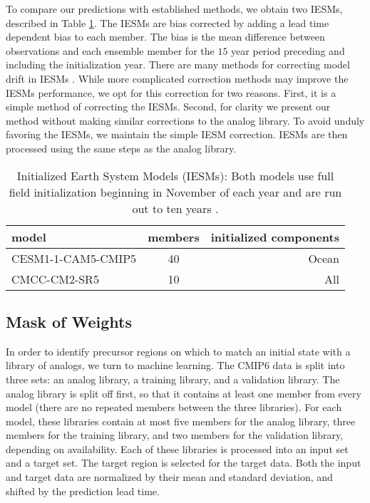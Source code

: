 To compare our predictions with established methods, we obtain two IESMs, described in Table \ref{table:iesms}.
The IESMs are bias corrected by adding a lead time dependent bias to each member.
The bias is the mean difference between observations and each ensemble member for the $15$ year period preceding and including the initialization year.
There are many methods for correcting model drift in IESMs \cite{meehl2022}.
While more complicated correction methods may improve the IESMs performance, we opt for this correction for two reasons.
First, it is a simple method of correcting the IESMs.
Second, for clarity we present our method without making similar corrections to the analog library.
To avoid unduly favoring the IESMs, we maintain the simple IESM correction.
IESMs are then processed using the same steps as the analog library.

\begin{table}
    \caption{
        Initialized Earth System Models (IESMs): Both models use full field initialization beginning in November of each year and are run out to ten years \cite{meehl2021}.
    }\label{table:iesms}
    \centering
    \begin{tabular}{l c r}
        \hline
        model & members & initialized components \\
        \hline
        CESM1-1-CAM5-CMIP5 & 40 & Ocean  \\
        CMCC-CM2-SR5       & 10 & All    \\
        \hline
    \end{tabular}
\end{table}

\subsection{Mask of Weights}\label{sec:mask}

In order to identify precursor regions on which to match an initial state with a library of analogs, we turn to machine learning.
The CMIP6 data is split into three sets: an analog library, a training library, and a validation library.
The analog library is split off first, so that it contains at least one member from every model (there are no repeated members between the three libraries).
For each model, these libraries contain at most five members for the analog library, three members for the training library, and two members for the validation library, depending on availability.
Each of these libraries is processed into an input set and a target set.
The target region is selected for the target data.
Both the input and target data are normalized by their mean and standard deviation, and shifted by the prediction lead time.

